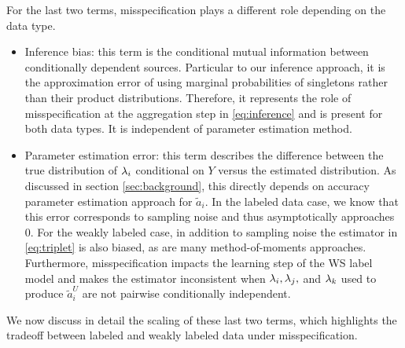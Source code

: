 For the last two terms, misspecification plays a different role depending on the data type. 
\begin{itemize}
  \setlength\itemsep{0em}
    \item Inference bias: this term is the conditional mutual information between conditionally dependent sources. Particular to our inference approach, it is the approximation error of using marginal probabilities of singletons rather than their product distributions. Therefore, it represents the role of misspecification at the aggregation step in \eqref{eq:inference} and is present for both data types. It is independent of parameter estimation method.
    \item Parameter estimation error: this term describes the difference between the true distribution of $\lambda_i$ conditional on $Y$ versus the estimated distribution. As discussed in section \ref{sec:background}, this directly depends on accuracy parameter estimation approach for $\widetilde{a}_i$. In the labeled data case, we know that this error corresponds to sampling noise and thus asymptotically approaches $0$. For the weakly labeled case, in addition to sampling noise the estimator in \eqref{eq:triplet} is also biased, as are many method-of-moments approaches. Furthermore, misspecification impacts the learning step of the WS label model and makes the estimator inconsistent when $\lambda_i, \lambda_j,$ and $\lambda_k$ used to produce $\widetilde{a}_i^U$ are not pairwise conditionally independent.
\end{itemize}

We now discuss in detail the scaling of these last two terms, which highlights the tradeoff between labeled and weakly labeled data under misspecification.



